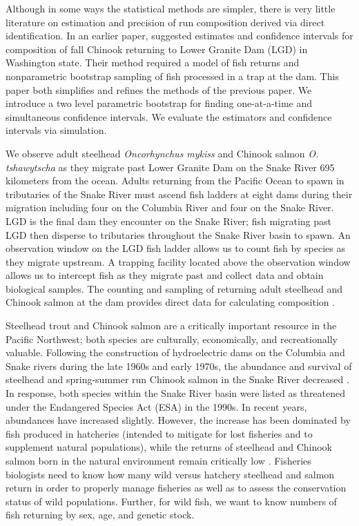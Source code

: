 \documentclass[%
                leqno,         %
%
]{nrc1}                          %
\begin{document}
Although in some ways the statistical methods are simpler, there is very little literature on estimation and precision of run composition derived via direct identification. In an earlier paper, \citet{Steinhorst2010} suggested estimates and confidence intervals for composition of fall Chinook returning to Lower Granite Dam (LGD) in Washington state.  Their method required a model of fish returns and nonparametric bootstrap sampling of fish processed in a trap at the dam.  This paper both simplifies and refines the methods of the previous paper. We introduce a two level parametric bootstrap for finding one-at-a-time and simultaneous confidence intervals. We evaluate the estimators and confidence intervals via simulation.

We observe adult steelhead \textit{Oncorhynchus mykiss} and Chinook salmon \textit{O. tshawytscha} as they migrate past Lower Granite Dam on the Snake River 695 kilometers from the ocean. Adults returning from the Pacific Ocean to spawn in tributaries of the Snake River must ascend fish ladders at eight dams during their migration including four on the Columbia River and four on the Snake River. LGD is the final dam they encounter on the Snake River; fish migrating past LGD then disperse to tributaries throughout the Snake River basin to spawn. An observation window on the LGD fish ladder allows us to count fish by species as they migrate upstream.  A trapping facility located above the observation window allows us to intercept fish as they migrate past and collect data and obtain biological samples.  The counting and sampling of returning adult steelhead and Chinook salmon at the dam provides direct data for calculating composition \citep{Harmon2003,Schrader2013}.

Steelhead trout and Chinook salmon are a critically important resource in the Pacific Northwest; both species are culturally, economically, and recreationally valuable. Following the construction of hydroelectric dams on the Columbia and Snake rivers during the late 1960s and early 1970s, the abundance and survival of steelhead and spring-summer run Chinook salmon in the Snake River decreased \citep{Raymond88}. In response, both species within the Snake River basin were listed as threatened under the Endangered Species Act (ESA) in the 1990s. In recent years, abundances have increased slightly. However, the increase has been dominated by fish produced in hatcheries (intended to mitigate for lost fisheries and to supplement natural populations), while the returns of steelhead and Chinook salmon born in the natural environment remain critically low \citep{Busby1996}. Fisheries biologists need to know how many wild versus hatchery steelhead and salmon return in order to properly manage fisheries as well as to assess the conservation status of wild populations. Further, for wild fish, we want to know numbers of fish returning by sex, age, and genetic stock.
\end{document}
